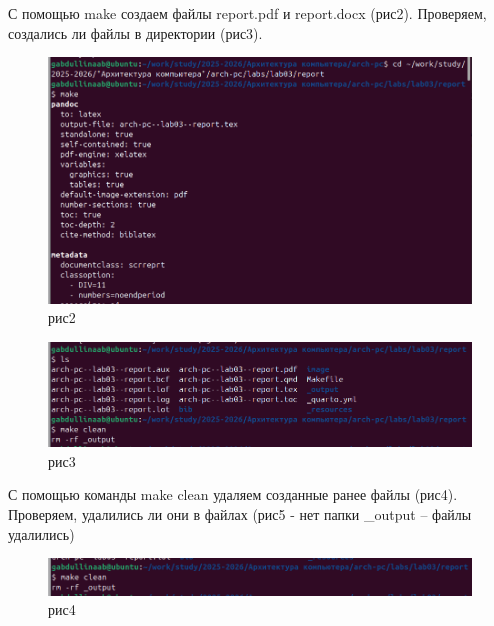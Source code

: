 \documentclass[
  english,
  russian,
  12pt,
  a4paper,
  DIV=11,
  numbers=noendperiod]{scrreprt}
\begin{document}
С помощью make создаем файлы report.pdf и report.docx (рис2). Проверяем,
создались ли файлы в директории (рис3).

\begin{figure}

{\centering \includegraphics[width=0.9\linewidth,height=\textheight,keepaspectratio]{image/рис2.png}

}

\caption{рис2}

\end{figure}%

\begin{figure}

{\centering \includegraphics[width=0.9\linewidth,height=\textheight,keepaspectratio]{image/рис3.png}

}

\caption{рис3}

\end{figure}%

С помощью команды make clean удаляем созданные ранее файлы (рис4).
Проверяем, удалились ли они в файлах (рис5 - нет папки \_output -- файлы
удалились)

\begin{figure}

{\centering \includegraphics[width=0.9\linewidth,height=\textheight,keepaspectratio]{image/рис4.png}

}

\caption{рис4}

\end{figure}%
\end{document}
